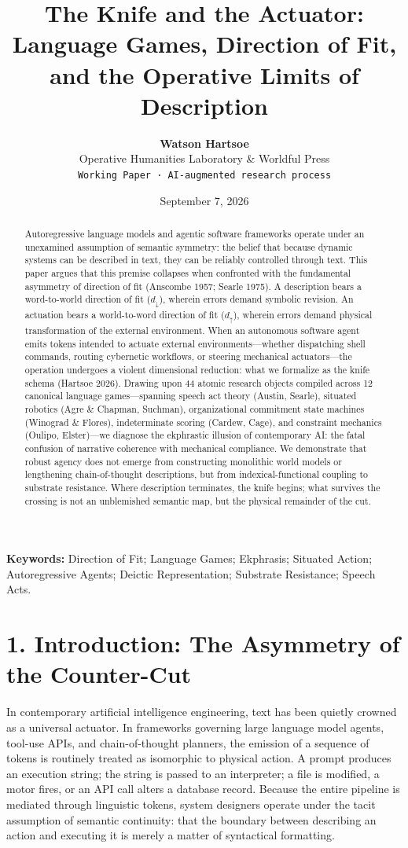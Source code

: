 \documentclass[11pt,twocolumn]{article}
\title{\textbf{The Knife and the Actuator: Language Games, Direction of Fit, and the Operative Limits of Description}}
\author{\textbf{Watson Hartsoe}\\
\small Operative Humanities Laboratory & Worldful Press\\
\small \texttt{Working Paper · AI-augmented research process}}
\date{September 7, 2026}
\begin{document}
\maketitle

\begin{abstract}
Autoregressive language models and agentic software frameworks operate under an unexamined assumption of semantic symmetry: the belief that because dynamic systems can be described in text, they can be reliably controlled through text. This paper argues that this premise collapses when confronted with the fundamental asymmetry of direction of fit (Anscombe 1957; Searle 1975). A description bears a word-to-world direction of fit ($d_\downarrow$), wherein errors demand symbolic revision. An actuation bears a world-to-word direction of fit ($d_\uparrow$), wherein errors demand physical transformation of the external environment. When an autonomous software agent emits tokens intended to actuate external environments—whether dispatching shell commands, routing cybernetic workflows, or steering mechanical actuators—the operation undergoes a violent dimensional reduction: what we formalize as the knife schema (Hartsoe 2026). Drawing upon 44 atomic research objects compiled across 12 canonical language games—spanning speech act theory (Austin, Searle), situated robotics (Agre & Chapman, Suchman), organizational commitment state machines (Winograd & Flores), indeterminate scoring (Cardew, Cage), and constraint mechanics (Oulipo, Elster)—we diagnose the ekphrastic illusion of contemporary AI: the fatal confusion of narrative coherence with mechanical compliance. We demonstrate that robust agency does not emerge from constructing monolithic world models or lengthening chain-of-thought descriptions, but from indexical-functional coupling to substrate resistance. Where description terminates, the knife begins; what survives the crossing is not an unblemished semantic map, but the physical remainder of the cut.
\end{abstract}

\noindent\textbf{Keywords:} Direction of Fit; Language Games; Ekphrasis; Situated Action; Autoregressive Agents; Deictic Representation; Substrate Resistance; Speech Acts.

\section*{1. Introduction: The Asymmetry of the Counter-Cut}
In contemporary artificial intelligence engineering, text has been quietly crowned as a universal actuator. In frameworks governing large language model agents, tool-use APIs, and chain-of-thought planners, the emission of a sequence of tokens is routinely treated as isomorphic to physical action. A prompt produces an execution string; the string is passed to an interpreter; a file is modified, a motor fires, or an API call alters a database record. Because the entire pipeline is mediated through linguistic tokens, system designers operate under the tacit assumption of semantic continuity: that the boundary between describing an action and executing it is merely a matter of syntactical formatting.
\end{document}
